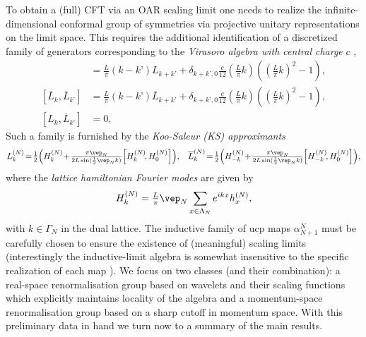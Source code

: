 \documentclass[a4paper, 11pt]{article}
\DeclareMathOperator{\1}{\mathds{1}}
\begin{document}
To obtain a (full) CFT via an OAR scaling limit one needs to realize the infinite-dimensional conformal group of symmetries via projective unitary representations on the limit space. This requires the additional identification of a discretized family of generators corresponding to the \emph{Virasoro algebra with central charge} $c$ \cite{DiFrancescoCFTBook},
\begin{align*}
[L_{k}, L_{k’}] & = \tfrac{L}{\pi}(k-k’)L_{k+k’} + \delta_{k+k’,0}\tfrac{c}{12}(\tfrac{L}{\pi}k)((\tfrac{L}{\pi}k)^2-1), \\ \nonumber 
[\overline{L}_{k}, \overline{L}_{k’}] & = \tfrac{L}{\pi}(k-k’)\overline{L}_{k+k’} + \delta_{k+k’,0}\tfrac{c}{12}(\tfrac{L}{\pi}k)((\tfrac{L}{\pi}k)^2-1), \\ \nonumber
[L_{k}, \overline{L}_{k’}] & = 0.
\end{align*}
Such a family is furnished by the \emph{Koo-Saleur (KS) approximants} \cite{KooRepresentationsOfThe} 
\begin{align*}
L_{k}^{(N)} &\!=\!\tfrac{1}{2}\Big(H_{k}^{(N)}\!+\!\tfrac{\pi\vep_{N}}{2L\sin(\frac{1}{2}\vep_{N}k)}\Big[H_{k}^{(N)}\!,H_0^{(N)}\Big]\Big), & \overline{L}_{k}^{(N)} \!=\!\tfrac{1}{2}\Big(H_{-k}^{(N)}\!+\!\tfrac{\pi\vep_{N}}{2L\sin(\frac{1}{2}\vep_{N}k)}\Big[H_{-k}^{(N)}\!,H_0^{(N)}\Big]\Big),
\end{align*}
where the \emph{lattice hamiltonian Fourier modes} are given by
\begin{align*}
H_k^{(N)} = \tfrac{L}{\pi}\vep_{N}\sum_{x\in \Lambda_{N}} e^{ikx} h^{(N)}_x,
\end{align*}
with $k\in\Gamma_{N}$ in the dual lattice. The inductive family of ucp maps $\alpha_{N+1}^N$ must be carefully chosen to ensure the existence of (meaningful) scaling limits (interestingly the inductive-limit algebra is somewhat insensitive to the specific realization of each map \cite{BlackadarGeneralizedInductiveLimits1}). We focus on two classes (and their combination): a real-space renormalisation group based on wavelets and their scaling functions \cite{DaubechiesTenLecturesOn} which explicitly maintains locality of the algebra and a momentum-space renormalisation group based on a sharp cutoff in momentum space. With this preliminary data in hand we turn now to a summary of the main results. 
\end{document}
